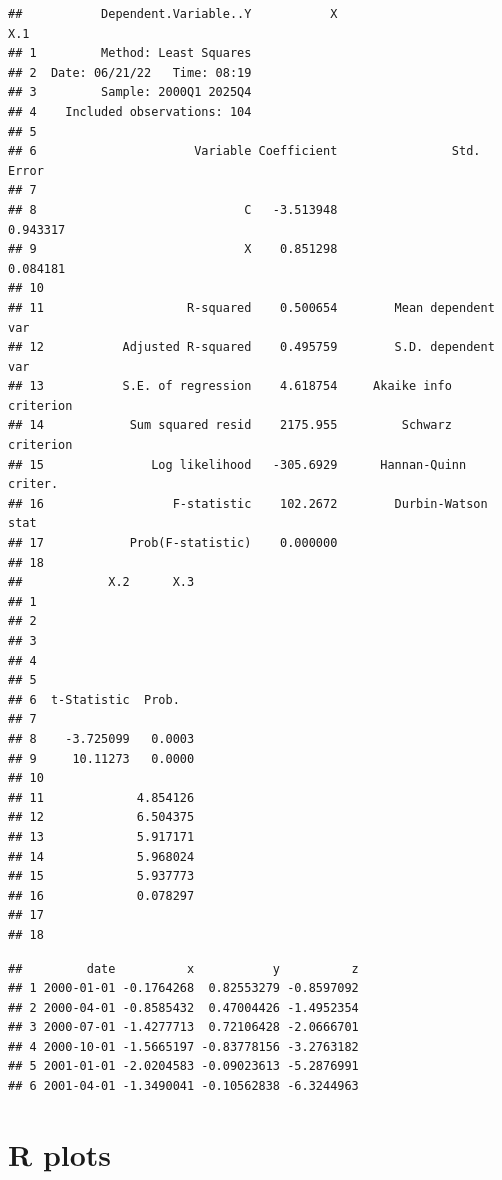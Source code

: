 \documentclass[
]{article}
\begin{document}
\begin{verbatim}
##           Dependent.Variable..Y           X                       X.1
## 1         Method: Least Squares                                      
## 2  Date: 06/21/22   Time: 08:19                                      
## 3         Sample: 2000Q1 2025Q4                                      
## 4    Included observations: 104                                      
## 5                                                                    
## 6                      Variable Coefficient                Std. Error
## 7                                                                    
## 8                             C   -3.513948                  0.943317
## 9                             X    0.851298                  0.084181
## 10                                                                   
## 11                    R-squared    0.500654        Mean dependent var
## 12           Adjusted R-squared    0.495759        S.D. dependent var
## 13           S.E. of regression    4.618754     Akaike info criterion
## 14            Sum squared resid    2175.955         Schwarz criterion
## 15               Log likelihood   -305.6929      Hannan-Quinn criter.
## 16                  F-statistic    102.2672        Durbin-Watson stat
## 17            Prob(F-statistic)    0.000000                          
## 18                                                                   
##            X.2      X.3
## 1                      
## 2                      
## 3                      
## 4                      
## 5                      
## 6  t-Statistic  Prob.  
## 7                      
## 8    -3.725099   0.0003
## 9     10.11273   0.0000
## 10                     
## 11             4.854126
## 12             6.504375
## 13             5.917171
## 14             5.968024
## 15             5.937773
## 16             0.078297
## 17                     
## 18
\end{verbatim}

\begin{verbatim}
##         date          x           y          z
## 1 2000-01-01 -0.1764268  0.82553279 -0.8597092
## 2 2000-04-01 -0.8585432  0.47004426 -1.4952354
## 3 2000-07-01 -1.4277713  0.72106428 -2.0666701
## 4 2000-10-01 -1.5665197 -0.83778156 -3.2763182
## 5 2001-01-01 -2.0204583 -0.09023613 -5.2876991
## 6 2001-04-01 -1.3490041 -0.10562838 -6.3244963
\end{verbatim}

\hypertarget{r-plots}{%
\section{R plots}\label{r-plots}}
\end{document}
